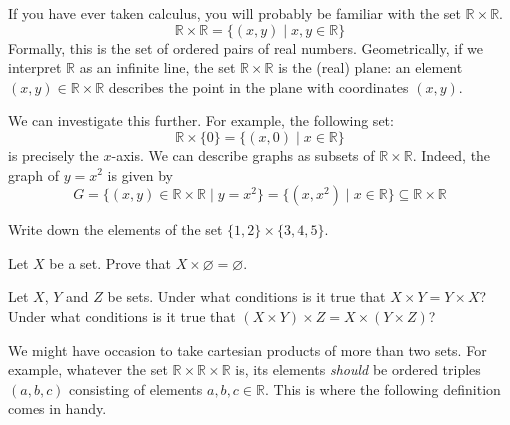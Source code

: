 \begin{example}
If you have ever taken calculus, you will probably be familiar with the set $\mathbb{R} \times \mathbb{R}$.
\[ \mathbb{R} \times \mathbb{R} = \{ (x,y) \mid x,y \in \mathbb{R} \} \]
Formally, this is the set of ordered pairs of real numbers. Geometrically, if we interpret $\mathbb{R}$ as an infinite line, the set $\mathbb{R} \times \mathbb{R}$ is the (real) plane: an element $(x,y) \in \mathbb{R} \times \mathbb{R}$ describes the point in the plane with coordinates $(x,y)$.

We can investigate this further. For example, the following set:
\[ \mathbb{R} \times \{ 0 \} = \{ (x,0) \mid x \in \mathbb{R} \} \]
is precisely the $x$-axis. We can describe graphs as subsets of $\mathbb{R} \times \mathbb{R}$. Indeed, the graph of $y=x^2$ is given by
\[ G = \{ (x,y) \in \mathbb{R} \times \mathbb{R} \mid y = x^2 \} = \{ (x,x^2) \mid x \in \mathbb{R} \} \subseteq \mathbb{R} \times \mathbb{R} \]
\end{example}

\begin{exercise}
Write down the elements of the set $\{ 1, 2 \} \times \{ 3, 4, 5 \}$.
\end{exercise}

\begin{exercise}
Let $X$ be a set. Prove that $X \times \varnothing = \varnothing$.
\end{exercise}

\begin{exercise}
\label{exCartesianProductNotAssociative}
Let $X$, $Y$ and $Z$ be sets. Under what conditions is it true that $X \times Y = Y \times X$? Under what conditions is it true that $(X \times Y) \times Z = X \times (Y \times Z)$?
\end{exercise}

We might have occasion to take cartesian products of more than two sets. For example, whatever the set $\mathbb{R} \times \mathbb{R} \times \mathbb{R}$ is, its elements \textit{should} be ordered triples $(a,b,c)$ consisting of elements $a,b,c \in \mathbb{R}$. This is where the following definition comes in handy.

